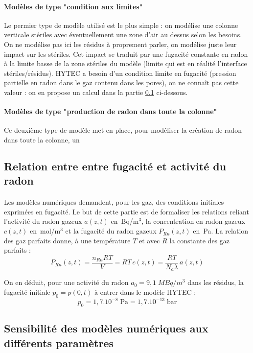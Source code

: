 \documentclass{article}
\begin{document}
\paragraph{Modèles de type "condition aux limites" } Le permier type de modèle utilisé est le plus simple : on modélise une colonne verticale stériles avec éventuellement une zone d'air au dessus selon les besoins. On ne modélise pas ici les résidus à proprement parler, on modélise juste leur impact sur les stériles. Cet impact se traduit par une fugacité constante en radon à la limite basse de la zone stériles du modèle (limite qui est en réalité l'interface stériles/résidus). HYTEC a besoin d'un condition limite en fugacité (pression partielle en radon dans le gaz contenu dans les pores), on ne connaît pas cette valeur : on en propose un calcul dans la partie \ref{annexe:fug_act} ci-dessous.

\paragraph{Modèles de type "production de radon dans toute la colonne"} Ce deuxième type de modèle met en place, pour modéliser la création de radon dans toute la colonne, un

\subsection{Relation entre entre fugacité et activité du radon}
\label{annexe:fug_act}
\paragraph{} Les modèles numériques demandent, pour les gaz, des conditions initiales exprimées en fugacité. Le but de cette partie est de formaliser les relations reliant l’activité du radon gazeux $a(z,t)$ en~Bq/m$^3$, la concentration en radon gazeux $c(z,t)$ en~mol/m$^3$ et la fugacité du radon gazeux $P_{Rn} (z,t)$ en~Pa. La relation des gaz parfaits donne, à une température $T$ et avec $R$ la constante des gaz parfaits :
$$
P_{Rn} (z,t)=\frac{n_{Rn} RT}{V}=RT\,c(z,t)=\frac{RT}{N_a \lambda}\, a(z,t)
$$

On en déduit, pour une activité du radon $a_0=9,1 \; MBq/m^3$ dans les résidus, la fugacité initiale $p_0=p(0,t)$ à entrer dans le modèle HYTEC :
$$
p_0=1,7 .10^{-8} \; \text{Pa}=1,7 .10^{-13} \; \text{bar}
$$

\subsection{Sensibilité des modèles numériques aux différents paramètres}
\label{annexe:sens_numerique}
\end{document}
